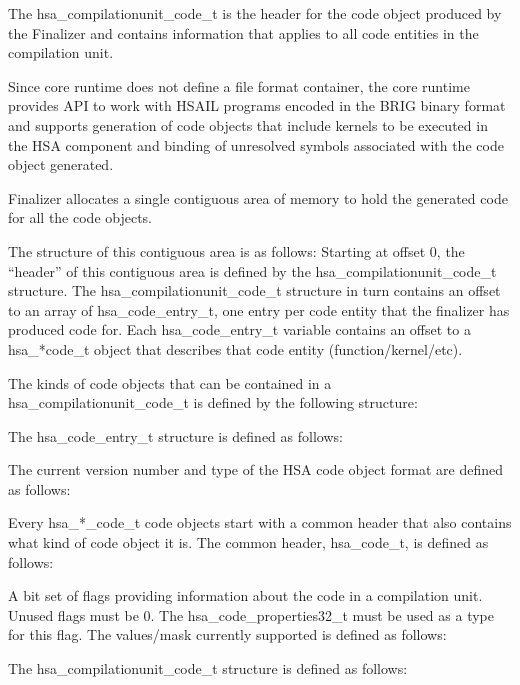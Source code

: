 \documentclass{book}
\newcommand{\reftyp}[1]{#1}
\begin{document}
\begin{appendices}
The \reftyp{hsa\_compilationunit\_code\_t} is the header for the
code object produced by the Finalizer and contains information that
applies to all code entities in the compilation unit.

Since core runtime does not define a file format container, the core
runtime provides API to work with HSAIL programs encoded in the BRIG
binary format and supports generation of code objects that
include kernels to be executed in the HSA component and binding
of unresolved symbols associated with the code object
generated.

Finalizer allocates a single contiguous area of memory to hold the
generated code for all the code objects.

The structure of this contiguous area is as follows: Starting at
offset 0, the ``header'' of this contiguous area is defined by the
\reftyp{hsa\_compilationunit\_code\_t} structure. The
\reftyp{hsa\_compilationunit\_code\_t} structure in turn contains
an offset to an array of \reftyp{hsa\_code\_entry\_t}, one entry per
code entity that the finalizer has produced code for. Each
\reftyp{hsa\_code\_entry\_t} variable contains an offset to a
\reftyp{hsa\_*code\_t} object that describes that code entity
(function/kernel/etc).

The kinds of code objects that can be contained in a
\reftyp{hsa\_compilationunit\_code\_t} is defined by the following
structure:


The \reftyp{hsa\_code\_entry\_t} structure is defined as follows:


The current version number and type of the HSA code object
format are defined as follows:



Every \reftyp{hsa\_*\_code\_t} code objects start with a common
header that also contains what kind of code object it is. The common
header, \reftyp{hsa\_code\_t}, is defined as follows:


A bit set of flags providing information about the code in a
compilation unit. Unused flags must be 0. The
\reftyp{hsa\_code\_properties32\_t} must be used as a type for this
flag. The values/mask currently supported is defined as follows:


The \reftyp{hsa\_compilationunit\_code\_t} structure is defined as
follows:



\end{appendices}
\end{document}
